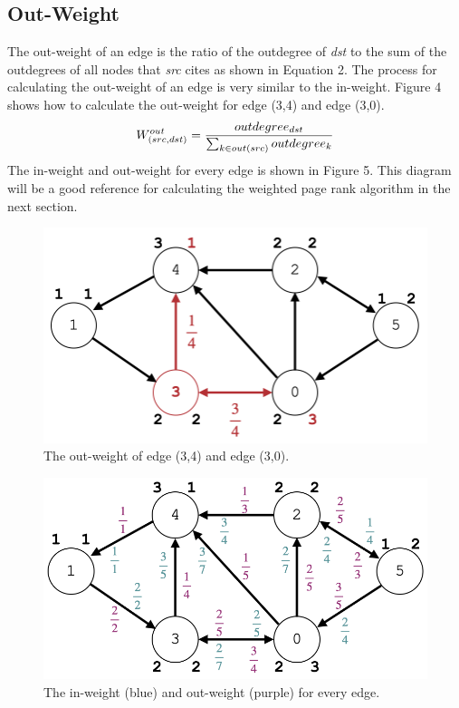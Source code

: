 \documentclass[journal]{IEEEtran}
\begin{document}
\subsection{Out-Weight}
The out-weight of an edge is the ratio of the outdegree of \emph{dst} to the sum of the outdegrees of all nodes that \emph{src} cites as shown in Equation 2. The process for calculating the out-weight of an edge is very similar to the in-weight. Figure 4 shows how to calculate the out-weight for edge (3,4) and edge (3,0).
\begin{equation}
\large W^{out}_{(src,dst)}=\frac{outdegree_{dst}}{\sum_{k\in out(src)}outdegree_{k}}
\end{equation}
The in-weight and out-weight for every edge is shown in Figure 5. This diagram will be a good reference for calculating the weighted page rank algorithm in the next section.
\begin{figure}[h!]
\begin{center}\includegraphics[scale=0.2]{4.png}\end{center}
\caption{The out-weight of edge (3,4) and edge (3,0).}
\end{figure}
\begin{figure}[h!]
\begin{center}\includegraphics[scale=0.2]{5.png}\end{center}
\caption{The in-weight (blue) and out-weight (purple) for every edge.}
\end{figure}
\end{document}
